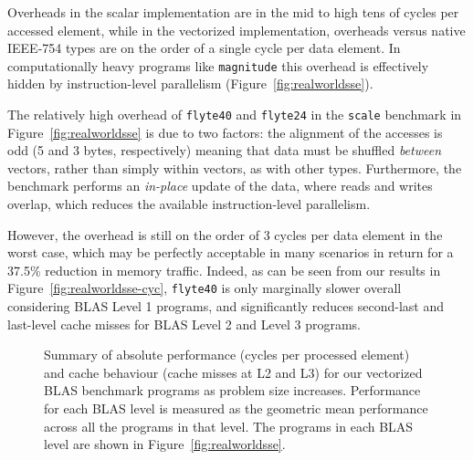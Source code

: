 \documentclass{sig-alternate-05-2015}
\newcommand{\mt}[1]{\texttt{#1}}
\begin{document}
Overheads in the scalar implementation are in the mid to high tens of cycles
per accessed element, while in the vectorized implementation, overheads versus
native IEEE-754 types are on the order of a single cycle per data element. In
computationally heavy programs like \texttt{magnitude} this overhead is
effectively hidden by instruction-level parallelism
(Figure~\ref{fig:realworldsse}).

The relatively high overhead of \mt{flyte40} and \mt{flyte24} in the
\texttt{scale} benchmark in Figure~\ref{fig:realworldsse} is due to two
factors: the alignment of the accesses is odd (5 and 3 bytes, respectively)
meaning that data must be shuffled \emph{between} vectors, rather than simply
within vectors, as with other types. Furthermore, the benchmark performs an
\emph{in-place} update of the data, where reads and writes overlap, which
reduces the available instruction-level parallelism.

However, the overhead is still on the order of 3 cycles per data element in the
worst case, which may be perfectly acceptable in many scenarios in return for a
37.5\% reduction in memory traffic. Indeed, as can be seen from our results in
Figure~\ref{fig:realworldsse-cyc}, \texttt{flyte40} is only marginally slower overall
considering BLAS Level 1 programs, and significantly reduces second-last and
last-level cache misses for BLAS Level 2 and Level 3 programs.

\begin{figure*}[!ht]
\centering

\qquad
{}\qquad
{}

\caption{Summary of absolute performance (cycles per processed element) and
cache behaviour (cache misses at L2 and L3) for our vectorized BLAS benchmark
programs as problem size increases. Performance for each BLAS level is measured
as the geometric mean performance across all the programs in that level. The
programs in each BLAS level are shown in Figure~\ref{fig:realworldsse}.}

\label{fig:overhead}

\end{figure*}
\end{document}
